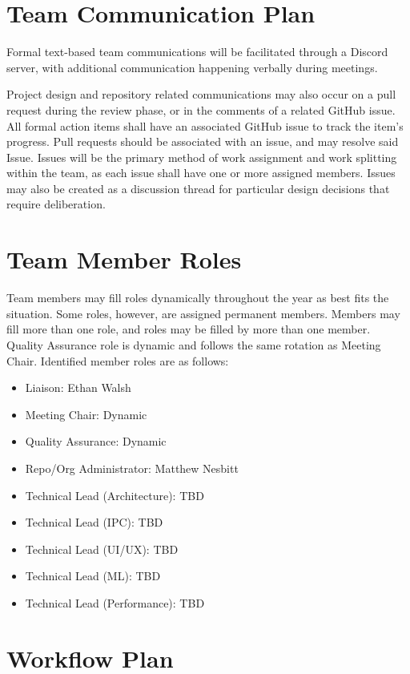 \documentclass{article}
\begin{document}
\section{Team Communication Plan}

Formal text-based team communications will be facilitated through a Discord server, with additional
communication happening verbally during meetings.

\vspace{5mm}

Project design and repository related communications may also occur on a pull request during the
review phase, or in the comments of a related GitHub issue. All formal action items shall have an
associated GitHub issue to track the item's progress. Pull requests should be associated with an
issue, and may resolve said Issue. Issues will be the primary method of work assignment and work
splitting within the team, as each issue shall have one or more assigned members. Issues may also be
created as a discussion thread for particular design decisions that require deliberation.

\section{Team Member Roles}

Team members may fill roles dynamically throughout the year as best fits the situation. Some roles,
however, are assigned permanent members. Members may fill more than one role, and roles may be
filled by more than one member. Quality Assurance role is dynamic and follows the same rotation as Meeting Chair.
Identified member roles are as follows:
\begin{itemize}
	\item Liaison: Ethan Walsh
	\item Meeting Chair: Dynamic
	\item Quality Assurance: Dynamic
	\item Repo/Org Administrator: Matthew Nesbitt
	\item Technical Lead (Architecture): TBD
	\item Technical Lead (IPC): TBD
	\item Technical Lead (UI/UX): TBD
	\item Technical Lead (ML): TBD
	\item Technical Lead (Performance): TBD
\end{itemize}

\section{Workflow Plan}
\end{document}
